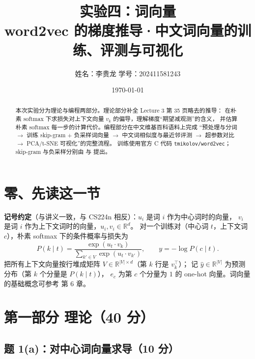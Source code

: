 \documentclass[11pt,a4paper]{article}
\title{实验四：词向量\\\large word2vec 的梯度推导·中文词向量的训练、评测与可视化}
\author{姓名：李贵龙 \quad 学号：202411581243}
\date{\today}
\begin{document}
\maketitle

\begin{abstract}
本次实验分为理论与编程两部分。理论部分补全 Lecture 3 第 35 页略去的推导：
在朴素 softmax 下求损失对上下文向量 $v_k$ 的偏导，理解梯度“期望减观测”的含义，
并估算朴素 softmax 每一步的计算代价。编程部分在中文维基百科语料上完成
“预处理与分词 $\to$ 训练 skip-gram + 负采样词向量 $\to$ 中文词相似度与最近邻评测
$\to$ 超参数对比 $\to$ PCA/t-SNE 可视化”的完整流程。
训练使用官方 C 代码 \texttt{tmikolov/word2vec}；skip-gram 与负采样分别由
\citet{mikolov2013efficient} 与 \citet{mikolov2013distributed} 提出。
\end{abstract}

\tableofcontents
\newpage

\section*{零、先读这一节}

\textbf{记号约定}（与讲义一致，与 CS224n 相反）：$u_i$ 是词 $i$ 作为中心词时的向量，
$v_i$ 是词 $i$ 作为上下文词时的向量，$u_i,v_i\in\mathbb{R}^d$。
对一个训练对（中心词 $t$，上下文词 $c$），朴素 softmax 下的条件概率与损失为
\begin{equation}
P(k\mid t)=\frac{\exp(u_t\cdot v_k)}{\sum_{k'\in V}\exp(u_t\cdot v_{k'})},
\qquad
y=-\log P(c\mid t).
\label{eq:loss}
\end{equation}
把所有上下文向量按行堆成矩阵 $V\in\mathbb{R}^{|V|\times d}$（第 $k$ 行是 $v_k^\top$）；
记 $\hat y\in\mathbb{R}^{|V|}$ 为预测分布（第 $k$ 个分量是 $P(k\mid t)$），
$e_c$ 为第 $c$ 个分量为 $1$ 的 one-hot 向量。词向量的基础概念可参考
\citet{jurafsky2024slp} 第 6 章。

\section{第一部分 理论（40 分）}

\subsection{题 1(a)：对中心词向量求导（10 分）}
\end{document}
